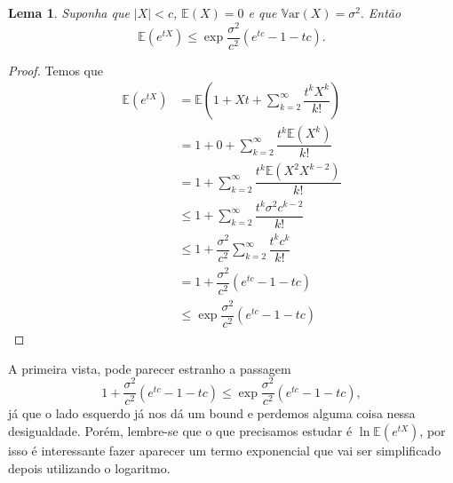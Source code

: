 \documentclass[12pt,a4paper,oneside]{book}
\newtheorem{lemma}[theorem]{Lema}
\theoremstyle{definition}
\theoremstyle{remark}
\numberwithin{equation}{section}
\newcommand{\E}{\mathbb{E}}
\newcommand{\Var}{\mathbb{V}\text{ar}}
\begin{document}
\begin{lemma}
Suponha que  $|X|<c$, $\E(X) = 0$ e que $\Var(X)=\sigma^2.$ Então
$$\E(e^{tX})\leq \exp{\dfrac{\sigma^2}{c^2}(e^{tc}-1-tc)}. $$
\end{lemma}

\begin{proof}
Temos que
\begin{align*}
\E(e^{tX}) &= \E\left(1 + Xt + \sum_{k=2}^\infty \dfrac{t^kX^k}{k!} \right) \\
	&= 1 + 0  + \sum_{k=2}^\infty \dfrac{t^k\E(X^k)}{k!}  \\
	&= 1  + \sum_{k=2}^\infty \dfrac{t^k\E(X^2X^{k-2})}{k!}  \\
	&\leq 1  + \sum_{k=2}^\infty \dfrac{t^k \sigma^2 c^{k-2} }{k!}  \\
	&\leq 1  + \dfrac{\sigma^2}{c^2}\sum_{k=2}^\infty \dfrac{t^k  c^{k} }{k!}  \\
	& = 1 + \dfrac{\sigma^2}{c^2}(e^{tc}-1-tc)\\
	&\leq \exp{\dfrac{\sigma^2}{c^2}(e^{tc}-1-tc)}
\end{align*}
\end{proof}
\begin{tcolorbox}[colback = yellow!60]
A primeira vista, pode parecer estranho  a passagem
$$ 	 1 + \dfrac{\sigma^2}{c^2}(e^{tc}-1-tc)
	\leq \exp{\dfrac{\sigma^2}{c^2}(e^{tc}-1-tc)},$$
já que o lado esquerdo já nos dá um bound e perdemos alguma coisa nessa desigualdade. Porém, lembre-se que o que precisamos estudar é $\ln \E(e^{tX})$, por isso é interessante fazer aparecer um termo exponencial que vai ser simplificado depois utilizando o logaritmo.
\end{tcolorbox}
\end{document}
